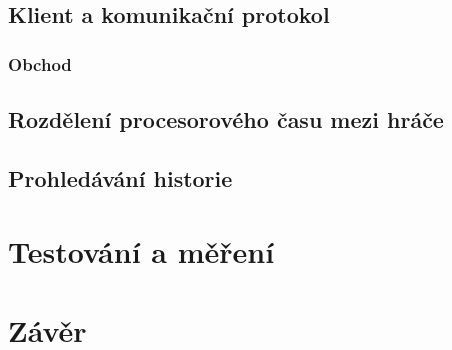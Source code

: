 \documentclass[11pt,oneside, final]{fithesis2}
\begin{document}
\section{Klient a komunikační protokol}


\subsection{Obchod}


\section{Rozdělení procesorového času mezi hráče}\label{serializaceHracu}


\section{Prohledávání historie}\label{chap:prohledavani_historie}


\chapter{Testování a měření}


\chapter{Závěr}


\end{document}
